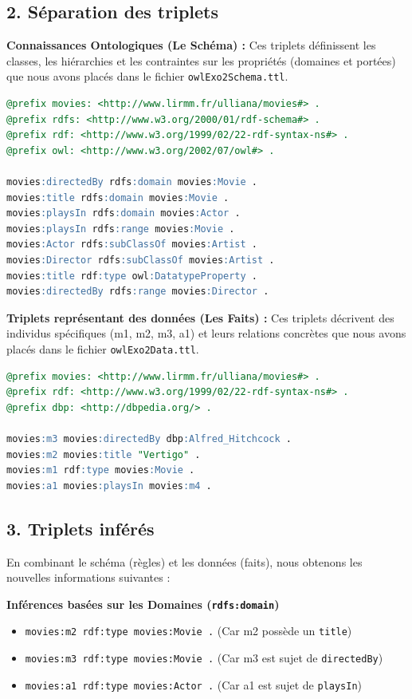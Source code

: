 \documentclass[11pt,a4paper]{article}
\begin{document}
\subsection*{2. Séparation des triplets}

\textbf{Connaissances Ontologiques (Le Schéma) :}
Ces triplets définissent les classes, les hiérarchies et les contraintes sur les propriétés (domaines et portées) que nous avons placés dans le fichier \texttt{owlExo2Schema.ttl}.

\begin{lstlisting}[language=SQL]
@prefix movies: <http://www.lirmm.fr/ulliana/movies#> .
@prefix rdfs: <http://www.w3.org/2000/01/rdf-schema#> .
@prefix rdf: <http://www.w3.org/1999/02/22-rdf-syntax-ns#> .
@prefix owl: <http://www.w3.org/2002/07/owl#> .

movies:directedBy rdfs:domain movies:Movie .
movies:title rdfs:domain movies:Movie .
movies:playsIn rdfs:domain movies:Actor .
movies:playsIn rdfs:range movies:Movie .
movies:Actor rdfs:subClassOf movies:Artist .
movies:Director rdfs:subClassOf movies:Artist .
movies:title rdf:type owl:DatatypeProperty .
movies:directedBy rdfs:range movies:Director .
\end{lstlisting}

\newpage

\textbf{Triplets représentant des données (Les Faits) :}
Ces triplets décrivent des individus spécifiques (m1, m2, m3, a1) et leurs relations concrètes que nous avons placés dans le fichier \texttt{owlExo2Data.ttl}.

\begin{lstlisting}[language=SQL]
@prefix movies: <http://www.lirmm.fr/ulliana/movies#> .
@prefix rdf: <http://www.w3.org/1999/02/22-rdf-syntax-ns#> .
@prefix dbp: <http://dbpedia.org/> .

movies:m3 movies:directedBy dbp:Alfred_Hitchcock .
movies:m2 movies:title "Vertigo" .
movies:m1 rdf:type movies:Movie .
movies:a1 movies:playsIn movies:m4 .
\end{lstlisting}

\subsection*{3. Triplets inférés}

En combinant le schéma (règles) et les données (faits), nous obtenons les nouvelles informations suivantes :

\textbf{Inférences basées sur les Domaines (\texttt{rdfs:domain})}
\begin{itemize}
    \item \texttt{movies:m2 rdf:type movies:Movie .} (Car m2 possède un \texttt{title})
    \item \texttt{movies:m3 rdf:type movies:Movie .} (Car m3 est sujet de \texttt{directedBy})
    \item \texttt{movies:a1 rdf:type movies:Actor .} (Car a1 est sujet de \texttt{playsIn})
\end{itemize}
\end{document}
